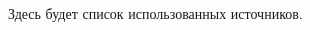 \begingroup
\renewcommand{\section}[2]{\Anonchapter{Список использованных источников}}
\begin{thebibliography}{00}

    Здесь будет список использованных источников.

\end{thebibliography}
\endgroup

\clearpage
